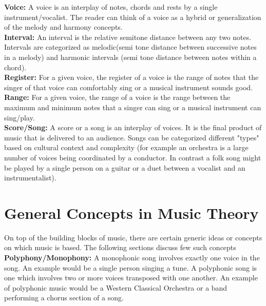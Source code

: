 \noindent \textbf{Voice:} \label{voice} A voice is an interplay of notes, chords and rests by a single instrument/vocalist. The reader can think of a voice as a hybrid or generalization of the melody and harmony concepts. \\

\noindent \textbf{Interval:} \label{interval} An interval is the relative semitone distance between any two notes. Intervals are categorized as melodic(semi tone distance between successive notes in a melody) and harmonic intervals (semi tone distance between notes within a chord). \\

\noindent \textbf{Register:} For a given voice, the register of a voice is the range of notes that the singer of that voice can comfortably sing or a musical instrument sounds good. \\

\noindent \textbf{Range:} For a given voice, the range of a voice is the range between the maximum and minimum notes that a singer can sing or a musical instrument can sing/play.  \\

\noindent \textbf{Score/Song:} A score or a song is an interplay of voices. It is the final product of music that is delivered to an audience. Songs can be categorized different "types" based on cultural context and complexity (for example an orchestra is a large number of voices being coordinated by a conductor. In contrast a folk song might be played by a single person on a guitar or a duet between a vocalist and an instrumentalist). 


\section{General Concepts in Music Theory}

\noindent On top of the building blocks of music, there are certain generic ideas or concepts on which music is based. The following sections discuss few such concepts \\

\noindent \textbf{Polyphony/Monophony:} A monophonic song involves exactly one voice in the song. An example would be a single person singing a tune. A polyphonic song is one which involves two or more voices transposed with one another. An example of polyphonic music would be a Western Classical Orchestra or a band performing a chorus section of a song. \\

